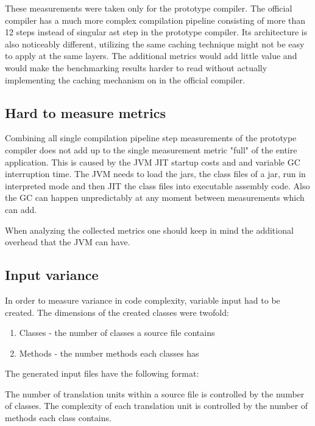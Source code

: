 \documentclass{VUMIFPSbakalaurinis}
\begin{document}
These measurements were taken only for the prototype compiler.
The official compiler has a much more complex compilation pipeline consisting of more than 12 steps instead of singular ast step in the prototype compiler.
Its architecture is also noticeably different, utilizing the same caching technique might not be easy to apply at the same layers.
The additional metrics would add little value and would make the benchmarking results harder to read without actually implementing the caching mechanism on in the official compiler.

\subsection{Hard to measure metrics}
Combining all single compilation pipeline step measurements of the prototype compiler does not add up to the single measurement metric "full" of the entire application.
This is caused by the JVM JIT startup costs and and variable GC interruption time.
The JVM needs to load the jars, the class files of a jar, run in interpreted mode and then JIT the class files into executable assembly code.
Also the GC can happen unpredictably at any moment between measurements which can add.

When analyzing the collected metrics one should keep in mind the additional overhead that the JVM can have.

\subsection{Input variance}
In order to measure variance in code complexity, variable input had to be created.
The dimensions of the created classes were twofold:

\begin{enumerate}
\item{Classes - the number of classes a source file contains}
\item{Methods - the number methods each classes has}
\end{enumerate}

The generated input files have the following format:



The number of translation units within a source file is controlled by the number of classes.
The complexity of each translation unit is controlled by the number of methods each class contains.
\end{document}
